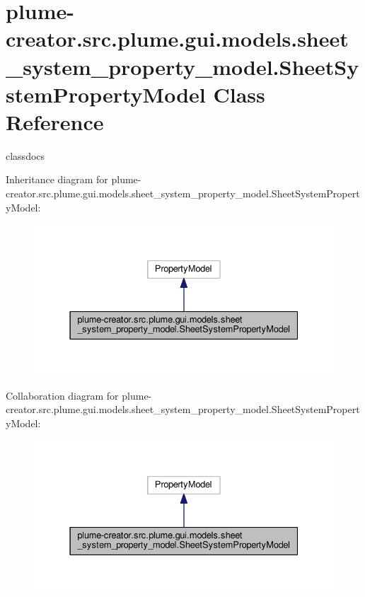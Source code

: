 \hypertarget{classplume-creator_1_1src_1_1plume_1_1gui_1_1models_1_1sheet__system__property__model_1_1_sheet_system_property_model}{}\section{plume-\/creator.src.\+plume.\+gui.\+models.\+sheet\+\_\+system\+\_\+property\+\_\+model.\+Sheet\+System\+Property\+Model Class Reference}
\label{classplume-creator_1_1src_1_1plume_1_1gui_1_1models_1_1sheet__system__property__model_1_1_sheet_system_property_model}


classdocs  




Inheritance diagram for plume-\/creator.src.\+plume.\+gui.\+models.\+sheet\+\_\+system\+\_\+property\+\_\+model.\+Sheet\+System\+Property\+Model\+:\nopagebreak
\begin{figure}[H]
\begin{center}
\leavevmode
\includegraphics[width=331pt]{classplume-creator_1_1src_1_1plume_1_1gui_1_1models_1_1sheet__system__property__model_1_1_sheet_bd0f67fa22952f81b718d1782c64d2eb}
\end{center}
\end{figure}


Collaboration diagram for plume-\/creator.src.\+plume.\+gui.\+models.\+sheet\+\_\+system\+\_\+property\+\_\+model.\+Sheet\+System\+Property\+Model\+:\nopagebreak
\begin{figure}[H]
\begin{center}
\leavevmode
\includegraphics[width=331pt]{classplume-creator_1_1src_1_1plume_1_1gui_1_1models_1_1sheet__system__property__model_1_1_sheet_39ac2e1c88d645aca350d4cfbddcd4b3}
\end{center}
\end{figure}
